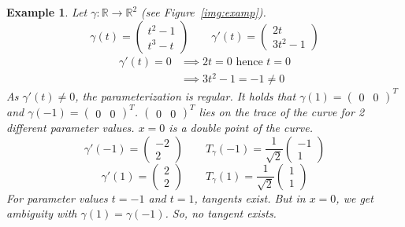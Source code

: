 \documentclass{article}
\newtheorem{example}{Example}  \numberwithin{example}{section}
\begin{document}
\begin{example}
  \label{ex:ex}
  Let $\gamma: \mathbb R \to \mathbb R^2$ (see Figure~\ref{img:examp}).
  \[ \gamma(t) = \begin{pmatrix} t^2 - 1 \\ t^3 - t \end{pmatrix} \qquad \gamma'(t) = \begin{pmatrix} 2t \\ 3t^2 - 1 \end{pmatrix} \]
  \begin{align*}
    \gamma'(t) = 0 &\implies 2t = 0 \text{ hence } t = 0 \\
                   &\implies 3t^2 - 1 = -1 \neq 0
  \end{align*}
  As $\gamma'(t) \neq 0$, the parameterization is \emph{regular}. It holds that $\gamma(1) = \begin{pmatrix} 0 & 0 \end{pmatrix}^T$ and $\gamma(-1) = \begin{pmatrix} 0 & 0 \end{pmatrix}^T$.
  $\begin{pmatrix} 0 & 0 \end{pmatrix}^T$ lies on the trace of the curve for 2 different parameter values.
  $x = 0$ is a double point of the curve.
  \[ \gamma'(-1) = \begin{pmatrix} -2 \\ 2 \end{pmatrix} \qquad T_{\gamma}(-1) = \frac1{\sqrt{2}} \begin{pmatrix} -1 \\ 1 \end{pmatrix} \]
  \[ \gamma'(1) = \begin{pmatrix} 2 \\ 2 \end{pmatrix} \qquad T_{\gamma}(1) = \frac1{\sqrt{2}} \begin{pmatrix} 1 \\ 1 \end{pmatrix} \]
  For parameter values $t = -1$ and $t = 1$, tangents exist. But in $x = 0$, we get ambiguity with $\gamma(1) = \gamma(-1)$. So, no tangent exists.
\end{example}
\end{document}
